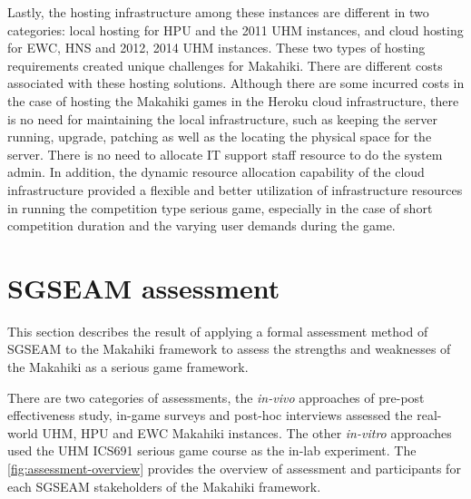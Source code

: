 Lastly, the hosting infrastructure among these instances are different in two categories: local hosting for HPU and the 2011 UHM instances, and cloud hosting for EWC, HNS and 2012, 2014 UHM instances. These two types of hosting requirements created unique challenges for Makahiki. There are different costs associated with these hosting solutions. Although there are some incurred costs in the case of hosting the Makahiki games in the Heroku cloud infrastructure, there is no need for maintaining the local infrastructure, such as keeping the server running, upgrade, patching as well as the locating the physical space for the server. There is no need to allocate IT support staff resource to do the system admin. In addition, the dynamic resource allocation capability of the cloud infrastructure provided a flexible and better utilization of infrastructure resources in running the competition type  serious game, especially in the case of short competition duration and the varying user demands during the game.

\section{SGSEAM assessment}

This section describes the result of applying a formal assessment method of SGSEAM to the Makahiki framework to assess the strengths and weaknesses of the Makahiki as a serious game framework.

There are two categories of assessments, the {\em in-vivo} approaches of pre-post effectiveness study, in-game surveys and post-hoc interviews assessed the real-world UHM, HPU and EWC Makahiki instances. The other {\em in-vitro} approaches used the UHM ICS691 serious game course as the in-lab experiment.  The \autoref{fig:assessment-overview} provides the overview of assessment and participants for each SGSEAM stakeholders of the Makahiki framework. 

